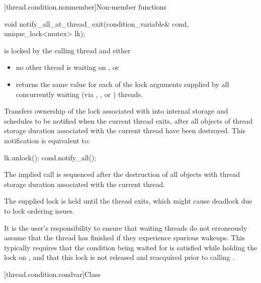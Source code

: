 [thread.condition.nonmember]{Non-member functions}
%
\begin{itemdecl}
void notify_all_at_thread_exit(condition_variable& cond, unique_lock<mutex> lk);
\end{itemdecl}

\begin{itemdescr}
\pnum
\expects
{} is locked by the calling thread and either
\begin{itemize}
\item no other thread is waiting on , or
\item {} returns the same value for each of the lock arguments
supplied by all concurrently waiting (via , ,
or ) threads.
\end{itemize}

\pnum
\effects
Transfers ownership of the lock associated with  into
internal storage and schedules  to be notified when the current
thread exits, after all objects of thread storage duration associated with
the current thread have been destroyed. This notification is equivalent to:
\begin{codeblock}
lk.unlock();
cond.notify_all();
\end{codeblock}

\pnum
\sync
The implied  call is sequenced after the destruction of
all objects with thread storage duration associated with the current thread.

\pnum
\begin{note}
The supplied lock is held until the thread exits,
which might cause deadlock due to lock ordering issues.
\end{note}

\pnum
\begin{note}
It is the user's responsibility to ensure that waiting threads
do not erroneously assume that the thread has finished if they experience
spurious wakeups. This typically requires that the condition being waited
for is satisfied while holding the lock on , and that this lock
is not released and reacquired prior to calling .
\end{note}
\end{itemdescr}

[thread.condition.condvar]{Class }

